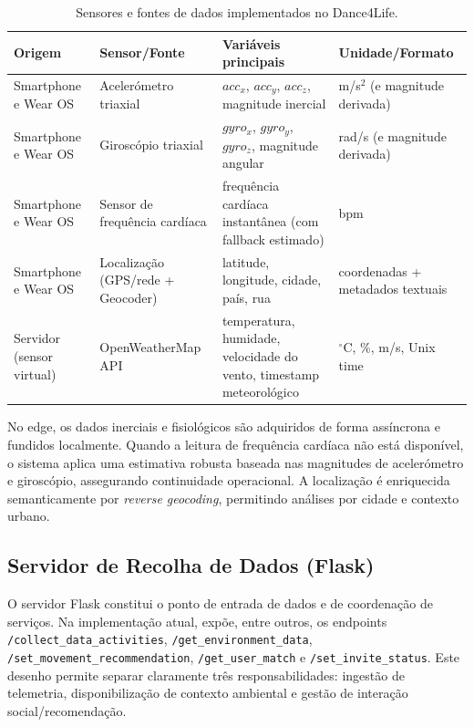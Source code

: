 \documentclass[runningheads]{llncs}
\begin{document}
\begin{table}[t]
\centering
\caption{Sensores e fontes de dados implementados no Dance4Life.}\label{tab:sensores_d4l}
\begin{tabular}{|p{3.0cm}|p{3.0cm}|p{4.5cm}|p{2.4cm}|}
\hline
\textbf{Origem} & \textbf{Sensor/Fonte} & \textbf{Variáveis principais} & \textbf{Unidade/Formato}\\
\hline
Smartphone e Wear OS & Acelerómetro triaxial & $acc_x$, $acc_y$, $acc_z$, magnitude inercial & m/s$^2$ (e magnitude derivada)\\
\hline
Smartphone e Wear OS & Giroscópio triaxial & $gyro_x$, $gyro_y$, $gyro_z$, magnitude angular & rad/s (e magnitude derivada)\\
\hline
Smartphone e Wear OS & Sensor de frequência cardíaca & frequência cardíaca instantânea (com fallback estimado) & bpm\\
\hline
Smartphone e Wear OS & Localização (GPS/rede + Geocoder) & latitude, longitude, cidade, país, rua & coordenadas + metadados textuais\\
\hline
Servidor (sensor virtual) & OpenWeatherMap API & temperatura, humidade, velocidade do vento, timestamp meteorológico & $^\circ$C, \%, m/s, Unix time\\
\hline
\end{tabular}
\end{table}

No edge, os dados inerciais e fisiológicos são adquiridos de forma assíncrona e fundidos localmente. Quando a leitura de frequência cardíaca não está disponível, o sistema aplica uma estimativa robusta baseada nas magnitudes de acelerómetro e giroscópio, assegurando continuidade operacional. A localização é enriquecida semanticamente por \emph{reverse geocoding}, permitindo análises por cidade e contexto urbano.

\subsection{Servidor de Recolha de Dados (Flask)}
O servidor Flask constitui o ponto de entrada de dados e de coordenação de serviços. Na implementação atual, expõe, entre outros, os endpoints \texttt{/collect\_data\_activities}, \texttt{/get\_environment\_data}, \texttt{/set\_movement\_recommendation}, \texttt{/get\_user\_match} e \texttt{/set\_invite\_status}. Este desenho permite separar claramente três responsabilidades: ingestão de telemetria, disponibilização de contexto ambiental e gestão de interação social/recomendação.
\end{document}
